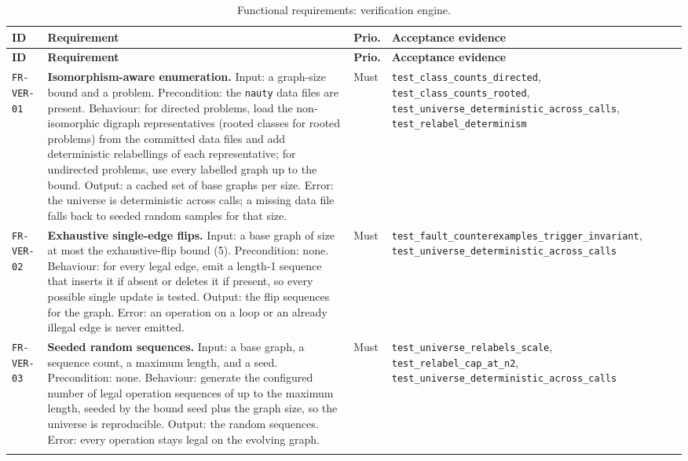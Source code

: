 \begin{longtable}{@{}>{\raggedright\arraybackslash}p{}>{\raggedright\arraybackslash}p{}p{}>{\raggedright\arraybackslash}p{}@{}}
\caption{Functional requirements: verification engine.}\label{tab:fr-ver}\\
\toprule
\textbf{ID} & \textbf{Requirement} & \textbf{Prio.} & \textbf{Acceptance evidence} \\
\midrule
\endfirsthead
\toprule
\textbf{ID} & \textbf{Requirement} & \textbf{Prio.} & \textbf{Acceptance evidence} \\
\midrule
\endhead
\bottomrule
\endfoot

\texttt{FR-VER-01} & \textbf{Isomorphism-aware enumeration.} Input: a graph-size
bound and a problem. Precondition: the \texttt{nauty} data files are present.
Behaviour: for directed problems, load the non-isomorphic digraph
representatives (rooted classes for rooted problems) from the committed data
files and add deterministic relabellings of each representative; for undirected
problems, use every labelled graph up to the bound. Output: a cached set of base
graphs per size. Error: the universe is deterministic across calls; a missing
data file falls back to seeded random samples for that size. & Must &
\texttt{test\_class\_counts\_directed}, \texttt{test\_class\_counts\_rooted},
\texttt{test\_universe\_deterministic\_across\_calls},
\texttt{test\_relabel\_determinism} \\
\addlinespace[2pt]

\texttt{FR-VER-02} & \textbf{Exhaustive single-edge flips.} Input: a base graph
of size at most the exhaustive-flip bound (5). Precondition: none. Behaviour:
for every legal edge, emit a length-1 sequence that inserts it if absent or
deletes it if present, so every possible single update is tested. Output: the
flip sequences for the graph. Error: an operation on a loop or an already
illegal edge is never emitted. & Must &
\texttt{test\_fault\_counterexamples\_trigger\_invariant},
\texttt{test\_universe\_deterministic\_across\_calls} \\
\addlinespace[2pt]

\texttt{FR-VER-03} & \textbf{Seeded random sequences.} Input: a base graph, a
sequence count, a maximum length, and a seed. Precondition: none. Behaviour:
generate the configured number of legal operation sequences of up to the maximum
length, seeded by the bound seed plus the graph size, so the universe is
reproducible. Output: the random sequences. Error: every operation stays legal
on the evolving graph. & Must & \texttt{test\_universe\_relabels\_scale},
\texttt{test\_relabel\_cap\_at\_n2},
\texttt{test\_universe\_deterministic\_across\_calls} \\
\addlinespace[2pt]


\end{longtable}
